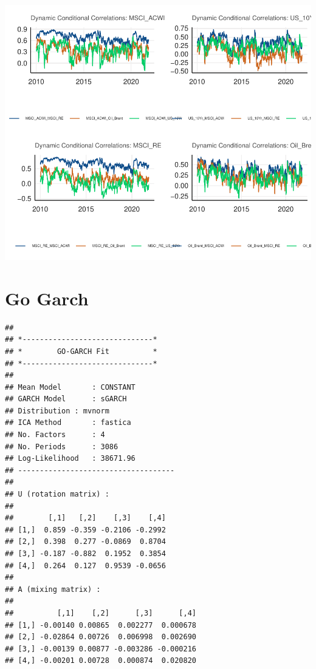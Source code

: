 \documentclass[11pt,preprint, authoryear]{elsarticle}
\numberwithin{equation}{section}
\numberwithin{figure}{section}
\numberwithin{table}{section}
\begin{document}
\includegraphics{Question6_files/figure-latex/unnamed-chunk-7-1.pdf}

\hypertarget{go-garch}{%
\section{Go Garch}\label{go-garch}}

\begin{verbatim}
## 
## *------------------------------*
## *        GO-GARCH Fit          *
## *------------------------------*
## 
## Mean Model       : CONSTANT
## GARCH Model      : sGARCH
## Distribution : mvnorm
## ICA Method       : fastica
## No. Factors      : 4
## No. Periods      : 3086
## Log-Likelihood   : 38671.96
## ------------------------------------
## 
## U (rotation matrix) : 
## 
##        [,1]   [,2]    [,3]    [,4]
## [1,]  0.859 -0.359 -0.2106 -0.2992
## [2,]  0.398  0.277 -0.0869  0.8704
## [3,] -0.187 -0.882  0.1952  0.3854
## [4,]  0.264  0.127  0.9539 -0.0656
## 
## A (mixing matrix) : 
## 
##          [,1]    [,2]      [,3]      [,4]
## [1,] -0.00140 0.00865  0.002277  0.000678
## [2,] -0.02864 0.00726  0.006998  0.002690
## [3,] -0.00139 0.00877 -0.003286 -0.000216
## [4,] -0.00201 0.00728  0.000874  0.020820
\end{verbatim}
\end{document}
